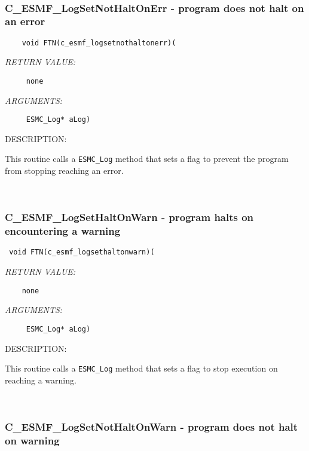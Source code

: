 \mbox{}\hrulefill\ 
 

  \subsubsection [C\_ESMF\_LogSetNotHaltOnErr] {C\_ESMF\_LogSetNotHaltOnErr - program does not halt on an error}


  
\begin{verbatim}    void FTN(c_esmf_logsetnothaltonerr)(\end{verbatim}{\em RETURN VALUE:}
\begin{verbatim}     none\end{verbatim}{\em ARGUMENTS:}
\begin{verbatim}     ESMC_Log* aLog)\end{verbatim}
{\sf DESCRIPTION:\\ }


      This routine calls a {\tt ESMC\_Log} method that sets a flag to 
      prevent the program
      from stopping reaching an error.  
 
\mbox{}\hrulefill\ 
 

  \subsubsection [C\_ESMF\_LogSetHaltOnWarn] {C\_ESMF\_LogSetHaltOnWarn - program halts on encountering a warning}


  
\begin{verbatim} void FTN(c_esmf_logsethaltonwarn)(\end{verbatim}{\em RETURN VALUE:}
\begin{verbatim}    none\end{verbatim}{\em ARGUMENTS:}
\begin{verbatim}     ESMC_Log* aLog)\end{verbatim}
{\sf DESCRIPTION:\\ }


      This routine calls a {\tt ESMC\_Log} method that sets a flag to stop execution on
      reaching a warning. 
 
\mbox{}\hrulefill\ 
 

  \subsubsection [C\_ESMF\_LogSetNotHaltOnWarn] {C\_ESMF\_LogSetNotHaltOnWarn - program does not halt on warning}


